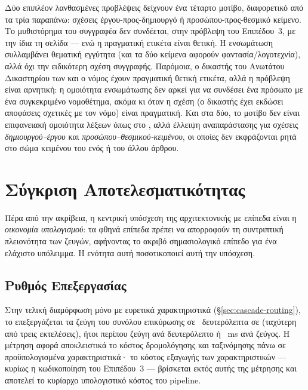 Δύο επιπλέον λανθασμένες προβλέψεις δείχνουν ένα τέταρτο μοτίβο, διαφορετικό
από τα τρία παραπάνω: σχέσεις έργου-προς-δημιουργό ή προσώπου-προς-θεσμικό
κείμενο. Το μυθιστόρημα  του συγγραφέα  δεν
συνδέεται, στην πρόβλεψη του Επιπέδου~3, με την ίδια τη σελίδα  --- ενώ η πραγματική ετικέτα είναι θετική. Η ενσωμάτωση συλλαμβάνει
θεματική εγγύτητα (και τα δύο κείμενα αφορούν φαντασία/λογοτεχνία), αλλά όχι
την ειδικότερη σχέση συγγραφής. Παρόμοια, ο δικαστής του Ανωτάτου Δικαστηρίου
των   και ο νόμος  έχουν πραγματική θετική ετικέτα, αλλά η πρόβλεψη είναι
αρνητική: η ομοιότητα ενσωμάτωσης δεν αρκεί για να συνδέσει ένα πρόσωπο με ένα
συγκεκριμένο νομοθέτημα, ακόμα κι όταν η σχέση (ο δικαστής έχει εκδώσει
αποφάσεις σχετικές με τον νόμο) είναι πραγματική. Και στα δύο, το μοτίβο δεν
είναι επιφανειακή ομοιότητα λέξεων όπως στο , αλλά έλλειψη
αναπαράστασης για σχέσεις \textit{δημιουργού--έργου} και
\textit{προσώπου--θεσμικού-κειμένου}, οι οποίες δεν εκφράζονται ρητά στο σώμα
κειμένου του ενός ή του άλλου άρθρου.


\section{Σύγκριση Αποτελεσματικότητας}
\label{sec:efficiency}

Πέρα από την ακρίβεια, η κεντρική υπόσχεση της αρχιτεκτονικής με επίπεδα είναι
η \textit{οικονομία υπολογισμού}: τα φθηνά επίπεδα πρέπει να απορροφούν τη
συντριπτική πλειονότητα των ζευγών, αφήνοντας το ακριβό σημασιολογικό επίπεδο για
ένα ελάχιστο υπόλειμμα.
Η ενότητα αυτή ποσοτικοποιεί αυτή την υπόσχεση.

\subsection{Ρυθμός Επεξεργασίας}
\label{subsec:throughput}

Στην τελική διαμόρφωση μόνο με ευρετικά χαρακτηριστικά (\S\ref{sec:cascade-routing}),
το  επεξεργάζεται τα \ValSplitSize{} ζεύγη του συνόλου επικύρωσης σε
\ThroughputSec~δευτερόλεπτα σε  (ταχύτερη από τρεις εκτελέσεις), ήτοι περίπου
\ThroughputRate{} ζεύγη ανά δευτερόλεπτο ή \ThroughputLatency~ms ανά ζεύγος.
Η μέτρηση αφορά αποκλειστικά
το κόστος δρομολόγησης και ταξινόμησης πάνω σε προϋπολογισμένα χαρακτηριστικά· το
κόστος εξαγωγής των χαρακτηριστικών --- κυρίως η κωδικοποίηση 
του Επιπέδου~3 --- βρίσκεται εκτός αυτής της μέτρησης και αποτελεί το κυρίαρχο
υπολογιστικό κόστος του pipeline.

